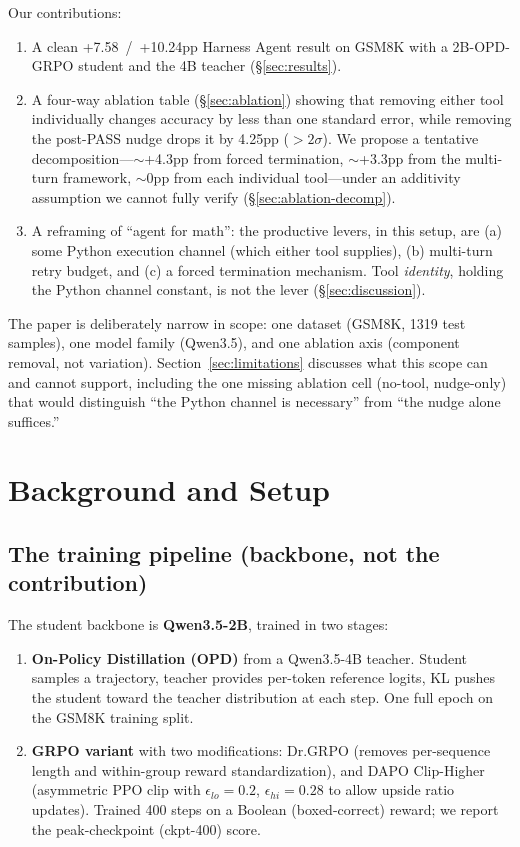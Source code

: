 \documentclass[10pt]{article}
\begin{document}
Our contributions:
\begin{enumerate}
  \item A clean +7.58~/~+10.24pp Harness Agent result on GSM8K with a 2B-OPD-GRPO student and the 4B teacher (\S\ref{sec:results}).
  \item A four-way ablation table (\S\ref{sec:ablation}) showing that removing either tool individually changes accuracy by less than one standard error, while removing the post-PASS nudge drops it by 4.25pp ($>\!2\sigma$). We propose a tentative decomposition---$\sim$+4.3pp from forced termination, $\sim$+3.3pp from the multi-turn framework, $\sim$0pp from each individual tool---under an additivity assumption we cannot fully verify (\S\ref{sec:ablation-decomp}).
  \item A reframing of ``agent for math'': the productive levers, in this setup, are (a) some Python execution channel (which either tool supplies), (b) multi-turn retry budget, and (c) a forced termination mechanism. Tool \emph{identity}, holding the Python channel constant, is not the lever (\S\ref{sec:discussion}).
\end{enumerate}

The paper is deliberately narrow in scope: one dataset (GSM8K, 1319 test samples), one model family (Qwen3.5), and one ablation axis (component removal, not variation). Section~\ref{sec:limitations} discusses what this scope can and cannot support, including the one missing ablation cell (no-tool, nudge-only) that would distinguish ``the Python channel is necessary'' from ``the nudge alone suffices.''

\section{Background and Setup}
\label{sec:setup}

\subsection{The training pipeline (backbone, not the contribution)}

The student backbone is \textbf{Qwen3.5-2B}, trained in two stages:
\begin{enumerate}
  \item \textbf{On-Policy Distillation (OPD)} \citep{opd} from a Qwen3.5-4B teacher. Student samples a trajectory, teacher provides per-token reference logits, KL pushes the student toward the teacher distribution at each step. One full epoch on the GSM8K training split.
  \item \textbf{GRPO variant} with two modifications: Dr.GRPO \citep{drgrpo} (removes per-sequence length and within-group reward standardization), and DAPO Clip-Higher \citep{dapo} (asymmetric PPO clip with $\epsilon_{lo}=0.2$, $\epsilon_{hi}=0.28$ to allow upside ratio updates). Trained 400 steps on a Boolean (boxed-correct) reward; we report the peak-checkpoint (ckpt-400) score.
\end{enumerate}
\end{document}
